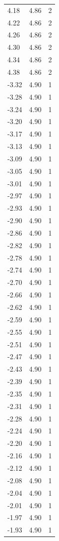 \begin{longtable}{lrr}
  4.18 & 4.86 & 2 \\
  4.22 & 4.86 & 2 \\
  4.26 & 4.86 & 2 \\
  4.30 & 4.86 & 2 \\
  4.34 & 4.86 & 2 \\
  4.38 & 4.86 & 2 \\
  -3.32 & 4.90 & 1 \\
  -3.28 & 4.90 & 1 \\
  -3.24 & 4.90 & 1 \\
  -3.20 & 4.90 & 1 \\
  -3.17 & 4.90 & 1 \\
  -3.13 & 4.90 & 1 \\
  -3.09 & 4.90 & 1 \\
  -3.05 & 4.90 & 1 \\
  -3.01 & 4.90 & 1 \\
  -2.97 & 4.90 & 1 \\
  -2.93 & 4.90 & 1 \\
  -2.90 & 4.90 & 1 \\
  -2.86 & 4.90 & 1 \\
  -2.82 & 4.90 & 1 \\
  -2.78 & 4.90 & 1 \\
  -2.74 & 4.90 & 1 \\
  -2.70 & 4.90 & 1 \\
  -2.66 & 4.90 & 1 \\
  -2.62 & 4.90 & 1 \\
  -2.59 & 4.90 & 1 \\
  -2.55 & 4.90 & 1 \\
  -2.51 & 4.90 & 1 \\
  -2.47 & 4.90 & 1 \\
  -2.43 & 4.90 & 1 \\
  -2.39 & 4.90 & 1 \\
  -2.35 & 4.90 & 1 \\
  -2.31 & 4.90 & 1 \\
  -2.28 & 4.90 & 1 \\
  -2.24 & 4.90 & 1 \\
  -2.20 & 4.90 & 1 \\
  -2.16 & 4.90 & 1 \\
  -2.12 & 4.90 & 1 \\
  -2.08 & 4.90 & 1 \\
  -2.04 & 4.90 & 1 \\
  -2.01 & 4.90 & 1 \\
  -1.97 & 4.90 & 1 \\
  -1.93 & 4.90 & 1 \\

\end{longtable}
